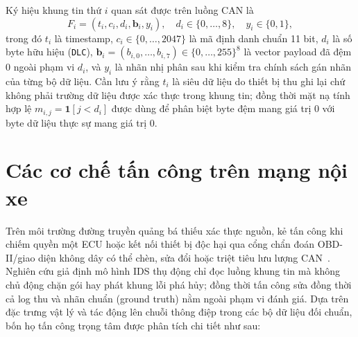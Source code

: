 \documentclass[12pt, a4paper, reqno, oneside]{book}
\DeclareRobustCommand{\code}[1]{\nolinkurl{#1}}
\begin{document}
Ký hiệu khung tin thứ $i$ quan sát được trên luồng CAN là
\begin{equation}\label{eq:can-frame}
F_i=(t_i,c_i,d_i,\mathbf{b}_i,y_i),\quad d_i\in\{0,\ldots,8\},\quad y_i\in\{0,1\},
\end{equation}
trong đó $t_i$ là timestamp, $c_i \in \{0,\ldots,2047\}$ là mã định danh chuẩn 11 bit, $d_i$ là số byte hữu hiệu (\code{DLC}), $\mathbf{b}_i=(b_{i,0},\ldots,b_{i,7}) \in \{0,\ldots,255\}^8$ là vector payload đã đệm $0$ ngoài phạm vi $d_i$, và $y_i$ là nhãn nhị phân sau khi kiểm tra chính sách gán nhãn của từng bộ dữ liệu. Cần lưu ý rằng $t_i$ là siêu dữ liệu do thiết bị thu ghi lại chứ không phải trường dữ liệu được xác thực trong khung tin; đồng thời mặt nạ tính hợp lệ $m_{i,j} = \mathbf{1}[j < d_i]$ được dùng để phân biệt byte đệm mang giá trị $0$ với byte dữ liệu thực sự mang giá trị $0$.

\section{Các cơ chế tấn công trên mạng nội xe}
Trên môi trường đường truyền quảng bá thiếu xác thực nguồn, kẻ tấn công khi chiếm quyền một ECU hoặc kết nối thiết bị độc hại qua cổng chẩn đoán OBD-II/giao diện không dây có thể chèn, sửa đổi hoặc triệt tiêu lưu lượng CAN~\cite{koscher2010experimental,checkoway2011comprehensive}. Nghiên cứu giả định mô hình IDS thụ động chỉ đọc luồng khung tin mà không chủ động chặn gói hay phát khung lỗi phá hủy; đồng thời tấn công sửa đồng thời cả log thu và nhãn chuẩn (ground truth) nằm ngoài phạm vi đánh giá. Dựa trên đặc trưng vật lý và tác động lên chuỗi thông điệp trong các bộ dữ liệu đối chuẩn, bốn họ tấn công trọng tâm được phân tích chi tiết như sau:
\end{document}
